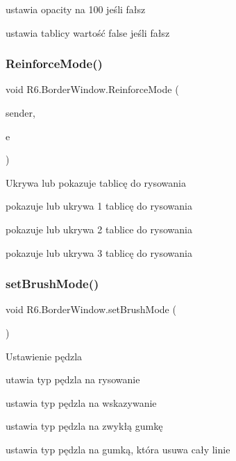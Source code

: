 ustawia opacity na 100 jeśli fałsz 

ustawia tablicy wartość false jeśli fałsz \mbox{\label{class_r6_1_1_border_window_aac448e44d41bd2ff00169c352fc54e97}} 
\subsubsection{\texorpdfstring{ReinforceMode()}{ReinforceMode()}}
{\footnotesize\ttfamily void R6.\+Border\+Window.\+Reinforce\+Mode (\begin{DoxyParamCaption}\item[{object}]{sender,  }\item[{Routed\+Event\+Args}]{e }\end{DoxyParamCaption})\hspace{0.3cm}{\ttfamily [private]}}



Ukrywa lub pokazuje tablicę do rysowania 

pokazuje lub ukrywa 1 tablicę do rysowania 

pokazuje lub ukrywa 2 tablice do rysowania 

pokazuje lub ukrywa 3 tablicę do rysowania \mbox{\label{class_r6_1_1_border_window_af513ea7da32c4569d81ff3bd1ac57ec7}} 
\subsubsection{\texorpdfstring{setBrushMode()}{setBrushMode()}}
{\footnotesize\ttfamily void R6.\+Border\+Window.\+set\+Brush\+Mode (\begin{DoxyParamCaption}{ }\end{DoxyParamCaption})\hspace{0.3cm}{\ttfamily [private]}}



Ustawienie pędzla 

utawia typ pędzla na rysowanie 

ustawia typ pędzla na wskazywanie 

ustawia typ pędzla na zwykłą gumkę 

ustawia typ pędzla na gumką, która usuwa cały linie \mbox{\label{class_r6_1_1_border_window_a8b03994a86c5669bb1cd8f8b1e7f4cfc}} 
